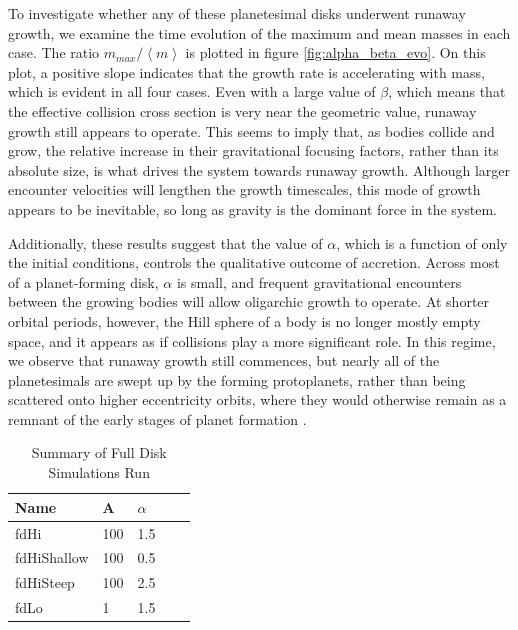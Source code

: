 \documentclass[twocolumn]{aastex63}
\begin{document}

To investigate whether any of these planetesimal disks underwent runaway growth, we examine the time evolution of the maximum and mean masses in each case. The ratio $m_{max}/\left< m \right>$ is plotted in figure \ref{fig:alpha_beta_evo}. On this plot, a positive slope indicates that the growth rate is accelerating with mass, which is evident in all four cases. Even with a large value of $\beta$, which means that the effective collision cross section is very near the geometric value, runaway growth still appears to operate. This seems to imply that, as bodies collide and grow, the relative increase in their gravitational focusing factors, rather than its absolute size, is what drives the system towards runaway growth. Although larger encounter velocities will lengthen the growth timescales, this mode of growth appears to be inevitable, so long as gravity is the dominant force in the system.

Additionally, these results suggest that the value of $\alpha$, which is a function of only the initial conditions, controls the qualitative outcome of accretion. Across most of a planet-forming disk, $\alpha$ is small, and frequent gravitational encounters between the growing bodies will allow oligarchic growth to operate. At shorter orbital periods, however, the Hill sphere of a body is no longer mostly empty space, and it appears as if collisions play a more significant role. In this regime, we observe that runaway growth still commences, but nearly all of the planetesimals are swept up by the forming protoplanets, rather than being scattered onto higher eccentricity orbits, where they would otherwise remain as a remnant of the early stages of planet formation \citep{kokubo98, kokubo00}.

\begin{table}
\begin{center}
\caption{Summary of Full Disk Simulations Run}
\begin{tabular}{lllll} \hline \hline
Name     & A & $\alpha$ &  &  \\ \hline
fdHi                 & 100                                                         & 1.5                              &  &  \\
fdHiShallow     & 100                                                        & 0.5                              &  &  \\
fdHiSteep       & 100                                                         & 2.5                              &  &  \\
fdLo                & 1                                                             & 1.5                              &  &  \\ \hline
\end{tabular}
\label{tab:sims}
\end{center}
\end{table}
\end{document}

